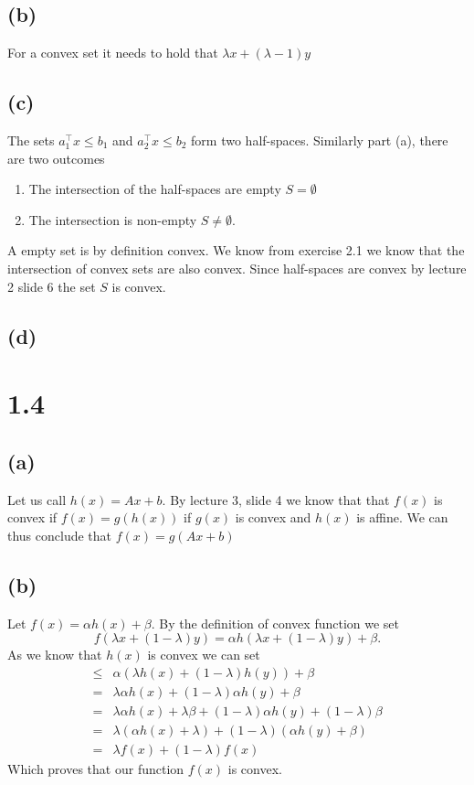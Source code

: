 \documentclass{article}
\begin{document}
	\subsection*{(b)}
		For a convex set it needs to hold that $\lambda x + (\lambda-1) y$
	\subsection*{(c)}
		The sets $a_1^\top x\leq b_1$ and $a_2^\top x\leq b_2$ form two half-spaces. Similarly part (a), there are two outcomes
		\begin{enumerate}
			\item The intersection of the half-spaces are empty $S=\emptyset$
			\item The intersection is non-empty $S\neq\emptyset$.
		\end{enumerate}
		A empty set is by definition convex. We know from exercise 2.1 we know that the intersection of convex sets are also convex. Since half-spaces are convex by lecture 2 slide 6 the set $S$ is convex.
	\subsection*{(d)}
		
\section*{1.4}
	\subsection*{(a)}
	Let us call $h(x) = Ax + b$.
	By lecture 3, slide 4 we know that that $f(x)$ is convex if $f(x) = g(h(x))$ if $g(x)$ is convex and $h(x)$ is affine. We can thus conclude that $f(x) = g(Ax+b)$
	\subsection*{(b)}
	Let $f(x)=\alpha h(x) + \beta$.
	By the definition of convex function we set
	\begin{equation}
		f(\lambda x + (1-\lambda) y ) =
		\alpha h(\lambda x + (1-\lambda) y ) + \beta.
	\end{equation}
	As we know that $h(x)$ is convex we can set
	\begin{align}
		\leq& \alpha (\lambda h(x) + (1-\lambda) h(y) ) + \beta \\
		= &\lambda \alpha h(x) + (1-\lambda)\alpha h(y) + \beta \\
		= & \lambda \alpha h(x) + \lambda\beta + (1-\lambda)\alpha h(y) + (1-\lambda)\beta \\
		=& \lambda (\alpha h(x) + \lambda) + (1-\lambda)(\alpha h(y) + \beta) \\
		=& \lambda f(x) + (1-\lambda)f(x)
	\end{align}
	Which proves that our function $f(x)$ is convex.
\end{document}
